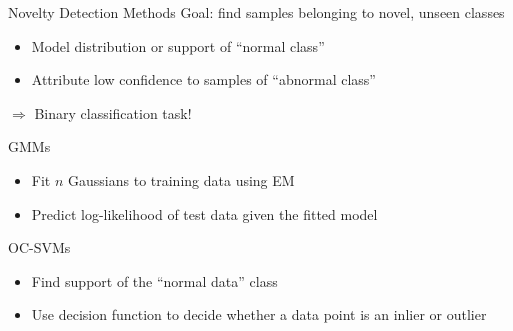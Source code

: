 \documentclass[xcolor={usenames,dvipsnames}]{beamer}
\begin{document}
\begin{frame}{Novelty Detection Methods}
	Goal: find samples belonging to novel, unseen classes
	\begin{itemize}
	\item Model distribution or support of ``normal class''
	\item Attribute low confidence to samples of ``abnormal class''
	\end{itemize}
	$\Rightarrow$ Binary classification task!
	\begin{block}{\glspl{GMM}}
	\begin{itemize}
		\item Fit $n$ Gaussians to training data using \gls{EM}
		\item Predict log-likelihood of test data given the fitted model
	\end{itemize}
	\end{block}
	\begin{block}{\glspl{OC-SVM}}
	\begin{itemize}
		\item Find support of the ``normal data'' class
		\item Use decision function to decide whether a data point is an inlier or outlier
	\end{itemize}
	\end{block}
\end{frame}
\end{document}
